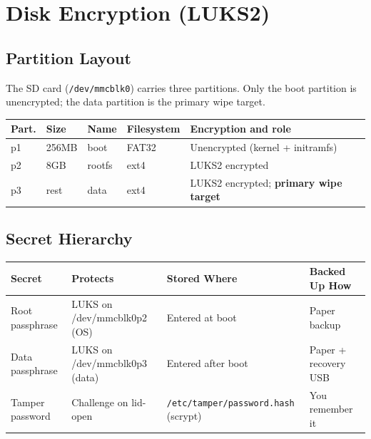\documentclass[11pt,letterpaper]{article}
\begin{document}
\section{Disk Encryption (LUKS2)}

\subsection{Partition Layout}

The SD card (\texttt{/dev/mmcblk0}) carries three partitions. Only the boot partition is unencrypted; the data partition is the primary wipe target.

{\centering
\begin{tabularx}{\textwidth}{L{1.1cm} L{1.4cm} L{1.5cm} L{2.3cm} Y}
\toprule
\textbf{Part.} & \textbf{Size} & \textbf{Name} & \textbf{Filesystem} & \textbf{Encryption and role} \\
\midrule
p1 & 256MB & boot & FAT32 & Unencrypted (kernel + initramfs) \\
p2 & 8GB & rootfs & ext4 & LUKS2 encrypted \\
 p3 & rest & data & ext4 & LUKS2 encrypted; \textbf{primary wipe target} \\
\bottomrule
\end{tabularx}\par}

\subsection{Secret Hierarchy}

{\centering\begin{tabularx}{\textwidth}{L{3.0cm} Y L{4.4cm} L{3.4cm}}
\toprule
\textbf{Secret} & \textbf{Protects} & \textbf{Stored Where} & \textbf{Backed Up How} \\
\midrule
Root passphrase & LUKS on /dev/mmcblk0p2 (OS) & Entered at boot & Paper backup \\
Data passphrase & LUKS on /dev/mmcblk0p3 (data) & Entered after boot & Paper + recovery USB \\
Tamper password & Challenge on lid-open & \texttt{/etc/tamper/\allowbreak password.hash} (scrypt) & You remember it \\
\bottomrule
\end{tabularx}\par}
\end{document}
